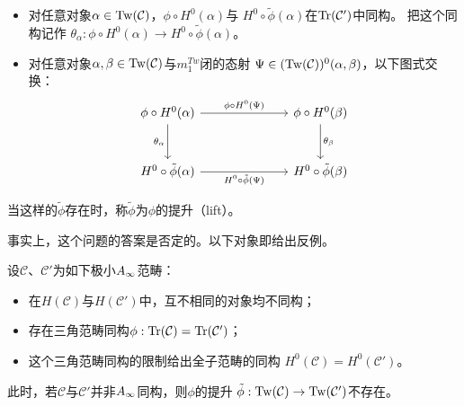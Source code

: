 \begin{itemize}[leftmargin=2em,itemsep=3pt,topsep=4pt]
  \item 对任意对象$\alpha\in\operatorname{Tw}(\mathcal{C})$，$\phi\circ H^{0}(\alpha)$与
        $H^{0}\circ\tilde{\phi}(\alpha)$在$\operatorname{Tr}(\mathcal{C}')$中同构。
        把这个同构记作
        $\theta_{\alpha}:\phi\circ H^{0}(\alpha)\to H^{0}\circ\tilde{\phi}(\alpha)$。
  \item 对任意对象$\alpha,\beta\in\operatorname{Tw}(\mathcal{C})$与$m_{1}^{Tw}$闭的态射
        $\Psi\in(\operatorname{Tw}(\mathcal{C}))^{0}(\alpha,\beta)$，以下图式交换：
\begin{equation}
\begin{tikzcd}[column sep=7em, row sep=2.8em]
  \phi\circ H^{0}(\alpha) \arrow[r, "{\phi\circ H^{0}(\Psi)}"]
  \arrow[d, "{\theta_{\alpha}}"'] &
  \phi\circ H^{0}(\beta) \arrow[d, "{\theta_{\beta}}"] \\
  H^{0}\circ\tilde{\phi}(\alpha) \arrow[r, "{H^{0}\circ\tilde{\phi}(\Psi)}"'] &
  H^{0}\circ\tilde{\phi}(\beta)
\end{tikzcd}
\label{eq:c03-8}
\end{equation}
\end{itemize}

当这样的$\tilde{\phi}$存在时，称$\tilde{\phi}$为$\phi$的提升（lift）。


事实上，这个问题的答案是否定的。以下对象即给出反例。

\begin{theorem}[{[12, Theorem 5.5]}]\label{thm:c03-4.2}
设$\mathcal{C}$、$\mathcal{C}'$为如下极小$A_{\infty}$范畴：
\begin{itemize}[leftmargin=2em,itemsep=3pt,topsep=4pt]
  \item 在$H(\mathcal{C})$与$H(\mathcal{C}')$中，互不相同的对象均不同构；
  \item 存在三角范畴同构$\phi:\operatorname{Tr}(\mathcal{C})=\operatorname{Tr}(\mathcal{C}')$；
  \item 这个三角范畴同构的限制给出全子范畴的同构
        $H^{0}(\mathcal{C})=H^{0}(\mathcal{C}')$。
\end{itemize}
此时，若$\mathcal{C}$与$\mathcal{C}'$并非$A_{\infty}$同构，则$\phi$的提升
$\tilde{\phi}:\operatorname{Tw}(\mathcal{C})\to\operatorname{Tw}(\mathcal{C}')$不存在。
\end{theorem}

